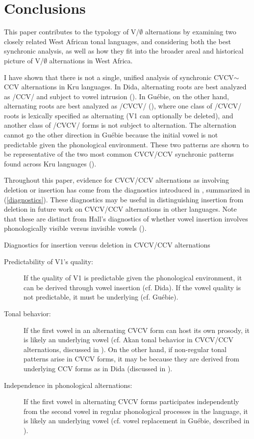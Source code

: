 \documentclass[output=paper,colorlinks,citecolor=brown]{langscibook}
\begin{document}
\section{Conclusions}\label{sec:conclusion}
This paper contributes to the typology of V/$\emptyset$ alternations by examining two closely related West African tonal languages, and considering both the best synchronic analysis, as well as how they fit into the broader areal and historical picture of V/$\emptyset$ alternations in West Africa. 

I have shown that there is not a single, unified analysis of synchronic CVCV$\sim$ CCV alternations in Kru languages. In Dida, alternating roots are best analyzed as /CCV/ and subject to vowel intrusion (). In Guébie, on the other hand, alternating roots are best analyzed as /CVCV/ (), where one class of /CVCV/ roots is  lexically specified as alternating (V1 can optionally be deleted), and another class of /CVCV/ forms is not subject to alternation. The alternation cannot go the other direction in Guébie because the initial vowel is not predictable given the phonological environment. These two patterns are shown to be representative of the two most common CVCV\slash CCV synchronic patterns found across Kru languages ().

Throughout this paper, evidence for CVCV\slash CCV alternations as involving deletion or insertion has come from the diagnostics introduced in , summarized in (\ref{diagnostics}). These diagnostics may be useful in distinguishing insertion from deletion in future work on CVCV\slash CCV alternations in other languages. Note that these are distinct from Hall's diagnostics of whether vowel insertion involves phonologically visible versus invisible vowels ().

\eanoraggedright Diagnostics for insertion versus deletion in CVCV\slash CCV alternations\label{diagnostics}
\begin{description}
	\item[Predictability of V1's quality:] If the quality of V1 is predictable given the phonological environment, it can be derived through vowel insertion (cf. Dida). If the vowel quality is not predictable, it must be underlying (cf. Guébie).
	\item[Tonal behavior:] If the first vowel in an alternating CVCV form can host its own prosody, it is likely an underlying vowel (cf. Akan tonal behavior in CVCV\slash CCV alternations, discussed in ). On the other hand, if non-regular tonal patterns arise in CVCV forms, it may be because they are derived from underlying CCV forms as in Dida (discussed in ).
	\item[Independence in phonological alternations:] If the first vowel in alternating CVCV forms participates independently from the second vowel in regular phonological processes in the language, it is likely an underlying vowel (cf. vowel replacement in Guébie, described in ).
\end{description}
\z
\end{document}
